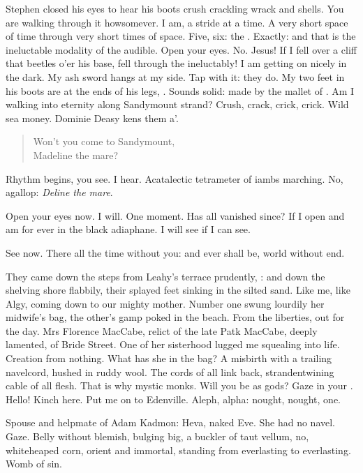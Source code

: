Stephen closed his eyes to hear his boots
crush crackling wrack and shells.
You are walking through it howsomever.
I am, a stride at a time.
A very short space of time through very short times of space.
Five, six: the .
Exactly: and that is the ineluctable modality of the audible.
Open your eyes.
No.
Jesus!
If I fell over a cliff that beetles o'er his base,
fell through the  ineluctably!
I am getting on nicely in the dark.
My ash sword hangs at my side.
Tap with it: they do.
My two feet in his boots are at the ends of his legs, .
Sounds solid:
made by the mallet of .
Am I walking into eternity along Sandymount strand?
Crush, crack, crick, crick.
Wild sea money.
Dominie Deasy kens them a'.


\begin{verse}
    Won't you come to Sandymount, \\
    Madeline the mare?
\end{verse}


Rhythm begins, you see.
I hear.
Acatalectic tetrameter of iambs marching.
No, agallop:
\emph{Deline the mare}.

Open your eyes now.
I will.
One moment.
Has all vanished since?
If I open and am for ever in the black adiaphane.
I will see if I can see.

See now.
There all the time without you:
and ever shall be,
world without end.

They came down the steps from Leahy's terrace prudently,
:
and down the shelving shore flabbily,
their splayed feet sinking in the silted sand.
Like me, like Algy,
coming down to our mighty mother.
Number one swung lourdily her midwife's bag,
the other's gamp poked in the beach.
From the liberties, out for the day.
Mrs Florence MacCabe,
relict of the late Patk MacCabe, deeply lamented,
of Bride Street.
One of her sisterhood lugged me squealing into life.
Creation from nothing.
What has she in the bag?
A misbirth with a trailing navelcord,
hushed in ruddy wool.
The cords of all link back,
strandentwining cable of all flesh.
That is why mystic monks.
Will you be as gods?
Gaze in your
.
Hello!
Kinch here.
Put me on to Edenville.
Aleph, alpha:
nought, nought, one.

Spouse and helpmate of Adam Kadmon:
Heva, naked Eve.
She had no navel.
Gaze.
Belly without blemish, bulging big,
a buckler of taut vellum,
no, whiteheaped corn,
orient and immortal,
standing from everlasting to everlasting.
Womb of sin.

